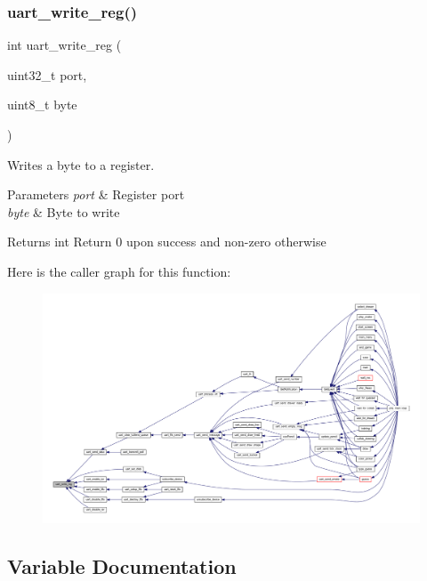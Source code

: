 \subsubsection{\texorpdfstring{uart\+\_\+write\+\_\+reg()}{uart\_write\_reg()}}
{\footnotesize\ttfamily int uart\+\_\+write\+\_\+reg (\begin{DoxyParamCaption}\item[{uint32\+\_\+t}]{port,  }\item[{uint8\+\_\+t}]{byte }\end{DoxyParamCaption})}



Writes a byte to a register. 


\begin{DoxyParams}{Parameters}
{\em port} & Register port \\
\hline
{\em byte} & Byte to write \\
\hline
\end{DoxyParams}
\begin{DoxyReturn}{Returns}
int Return 0 upon success and non-\/zero otherwise 
\end{DoxyReturn}
Here is the caller graph for this function\+:\nopagebreak
\begin{figure}[H]
\begin{center}
\leavevmode
\includegraphics[width=350pt]{group__uart_ga59c922bd359845f14061ced67e74c6b3_icgraph}
\end{center}
\end{figure}


\subsection{Variable Documentation}
\mbox{\label{group__uart_gaa2ce8acb1a0127464440fd3ca00cc283}} 
